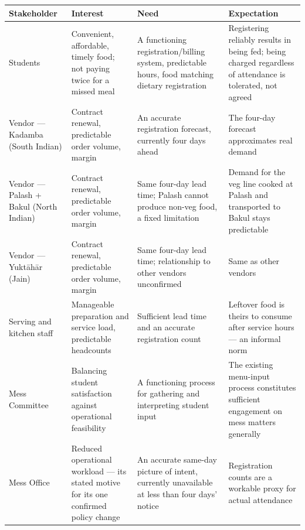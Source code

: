 \documentclass[11pt]{article}
\begin{document}
{\small\setlength{\tabcolsep}{4pt}
\begin{longtable}{L{0.19\textwidth}L{0.23\textwidth}L{0.23\textwidth}L{0.21\textwidth}}
\toprule
\textbf{Stakeholder} & \textbf{Interest} & \textbf{Need} & \textbf{Expectation} \\
\midrule
\endhead
Students & Convenient, affordable, timely food; not paying twice for a missed meal &
A functioning registration/billing system, predictable hours, food matching dietary
registration & Registering reliably results in being fed; being charged regardless
of attendance is tolerated, not agreed \\[4pt]

Vendor --- Kadamba (South Indian) & Contract renewal, predictable order volume,
margin & An accurate registration forecast, currently four days ahead & The four-day
forecast approximates real demand \\[4pt]

Vendor --- Palash + Bakul (North Indian) & Contract renewal, predictable order
volume, margin & Same four-day lead time; Palash cannot produce non-veg food, a fixed
limitation & Demand for the veg line cooked at Palash and transported to Bakul stays
predictable \\[4pt]

Vendor --- Yukt\={a}h\={a}r (Jain) & Contract renewal, predictable order volume,
margin & Same four-day lead time; relationship to other vendors unconfirmed & Same as
other vendors \\[4pt]

Serving and kitchen staff & Manageable preparation and service load, predictable
headcounts & Sufficient lead time and an accurate registration count & Leftover food
is theirs to consume after service hours --- an informal norm \\[4pt]

Mess Committee & Balancing student satisfaction against operational feasibility & A
functioning process for gathering and interpreting student input & The existing
menu-input process constitutes sufficient engagement on mess matters generally \\[4pt]

Mess Office & Reduced operational workload --- its stated motive for its one
confirmed policy change & An accurate same-day picture of intent, currently
unavailable at less than four days' notice & Registration counts are a workable
proxy for actual attendance \\[4pt]


\end{longtable}}
\end{document}
